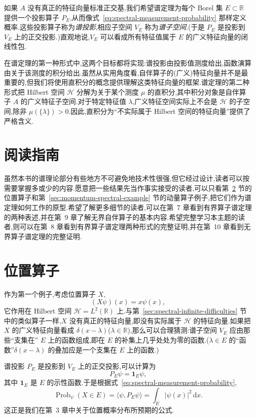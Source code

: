 如果 \(A\) 没有真正的特征向量标准正交基,我们希望谱定理为每个 Borel 集 \(E\subset\mathbb{R}\) 提供一个投影算子 \(P_{E}\),从而像式~\eqref{eq:spectral-measurement-probability} 那样定义概率.这些投影算子称为\emph{谱投影},相应子空间 \(V_{E}\) 称为\emph{谱子空间}.(于是 \(P_{E}\) 是投影到 \(V_{E}\) 上的正交投影.)直观地说,\(V_{E}\) 可以看成所有特征值属于 \(E\) 的广义特征向量的闭线性包.

在谱定理的第一种形式中,这两个目标都将实现:谱投影由投影值测度给出,函数演算由关于该测度的积分给出.虽然从实用角度看,自伴算子的(广义)特征向量并不是最重要的,但我们将使用直积分的概念提供理解这类特征向量的框架.谱定理的第二种形式把 Hilbert 空间 \(\mathcal{H}\) 分解为关于某个测度 \(\mu\) 的直积分,其中积分对象是自伴算子 \(A\) 的广义特征子空间.对于特定特征值 \(\lambda\),广义特征空间实际上不会是 \(\mathcal{H}\) 的子空间,除非 \(\mu(\{\lambda\})>0\).因此,直积分为“不实际属于 Hilbert 空间的特征向量”提供了严格含义.

\section{阅读指南}\label{sec:spectral-reading-guide}

虽然本书的谱理论部分有些地方不可避免地技术性很强,但它经过设计,读者可以按需要掌握多或少的内容.愿意把一些结果先当作事实接受的读者,可以只看第~\ref{sec:position-spectral-example} 节的位置算子和第~\ref{sec:momentum-spectral-example} 节的动量算子例子,把它们作为谱定理如何工作的原型.希望了解更多细节的读者,可以在第~7 章看到有界算子谱定理的两种表述,并在第~9 章了解无界自伴算子的基本内容.希望完整学习本主题的读者,则可以在第~8 章看到有界算子谱定理两种形式的完整证明,并在第~10 章看到无界算子谱定理的完整证明.

\section{位置算子}\label{sec:position-spectral-example}

作为第一个例子,考虑位置算子 \(X\),
\[
(X\psi)(x)=x\psi(x),
\]
它作用在 Hilbert 空间 \(\mathcal{H}=L^{2}(\mathbb{R})\) 上.与第~\ref{sec:spectral-infinite-difficulties} 节中的类似算子一样,\(X\) 没有真正的特征向量,即没有实际属于 \(\mathcal{H}\) 的特征向量.如果把 \(X\) 的广义特征向量看成 \(\delta(x-\lambda)\)(\(\lambda\in\mathbb{R}\)),那么可以合理猜测:谱子空间 \(V_{E}\) 应由那些“支集在” \(E\) 上的函数组成,即在 \(E\) 的补集上几乎处处为零的函数.(\(\lambda\in E\) 的“函数”\(\delta(x-\lambda)\) 的叠加应是一个支集在 \(E\) 上的函数.)

谱投影 \(P_{E}\) 是投影到 \(V_{E}\) 上的正交投影,可以计算为
\[
P_{E}\psi=\mathbf{1}_{E}\psi,
\]
其中 \(\mathbf{1}_{E}\) 是 \(E\) 的示性函数.于是根据式~\eqref{eq:spectral-measurement-probability},
\[
\operatorname{Prob}_{\psi}(X\in E)
=\langle\psi,P_{E}\psi\rangle
=\int_{E}|\psi(x)|^{2}\,\mathrm{d}x.
\]
这正是我们在第~3 章中关于位置概率分布所预期的公式.

